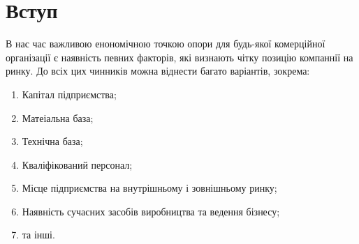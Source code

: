 





\maketitle


\tableofcontents


%


\section{Вступ}
В нас час важливою енономічною точкою опори для будь-якої комерційної організації є наявність певних факторів, які визнають чітку позицію компаннії на ринку. До всіх цих чинників можна віднести багато варіантів, зокрема:
\begin{enumerate}
\item Капітал підприємства;
\item Матеіальна база;
\item Технічна база;
\item Кваліфікований персонал;
\item Місце підприємства на внутрішньому і зовнішньому ринку;
\item Наявність сучасних засобів виробництва та ведення бізнесу;
\item та інші.
\end{enumerate}

